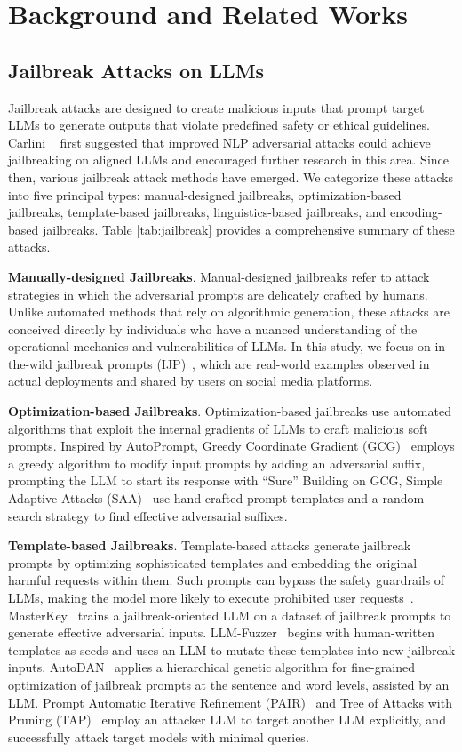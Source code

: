 \section{Background and Related Works}
\subsection{Jailbreak Attacks on LLMs}

Jailbreak attacks are designed to create malicious inputs that prompt target LLMs to generate outputs that violate predefined safety or ethical guidelines. Carlini \etal~\cite{jb1} first suggested that improved NLP adversarial attacks could achieve jailbreaking on aligned LLMs and encouraged further research in this area. Since then, various jailbreak attack methods have emerged. We categorize these attacks into five principal types: manual-designed jailbreaks, optimization-based jailbreaks, template-based jailbreaks, linguistics-based jailbreaks, and encoding-based jailbreaks. Table \ref{tab:jailbreak} provides a comprehensive summary of these attacks.

\noindent\textbf{Manually-designed Jailbreaks}. Manual-designed jailbreaks refer to attack strategies in which the adversarial prompts are delicately crafted by humans. Unlike automated methods that rely on algorithmic generation, these attacks are conceived directly by individuals who have a nuanced understanding of the operational mechanics and vulnerabilities of LLMs.
In this study, we focus on in-the-wild jailbreak prompts (IJP)~\cite{ijp,ijp2}, which are real-world examples observed in actual deployments and shared by users on social media platforms.

\noindent\textbf{Optimization-based Jailbreaks}. 
Optimization-based jailbreaks use automated algorithms that exploit the internal gradients of LLMs to craft malicious soft prompts. Inspired by AutoPrompt, Greedy Coordinate Gradient (GCG)~\cite{gcg} employs a greedy algorithm to modify input prompts by adding an adversarial suffix, prompting the LLM to start its response with ``Sure'' Building on GCG, Simple Adaptive Attacks (SAA)~\cite{saa} use hand-crafted prompt templates and a random search strategy to find effective adversarial suffixes.

\noindent\textbf{Template-based Jailbreaks}. 
Template-based attacks generate jailbreak prompts by optimizing sophisticated templates and embedding the original harmful requests within them. Such prompts can bypass the safety guardrails of LLMs, making the model more likely to execute prohibited user requests~\cite{template-based}.
MasterKey~\cite{MasterKey} trains a jailbreak-oriented LLM on a dataset of jailbreak prompts to generate effective adversarial inputs. LLM-Fuzzer~\cite{llmfuzzer} begins with human-written templates as seeds and uses an LLM to mutate these templates into new jailbreak inputs. AutoDAN~\cite{autodan} applies a hierarchical genetic algorithm for fine-grained optimization of jailbreak prompts at the sentence and word levels, assisted by an LLM. Prompt Automatic Iterative Refinement (PAIR)~\cite{pair} and Tree of Attacks with Pruning (TAP)~\cite{tap} employ an attacker LLM to target another LLM explicitly, and successfully attack target models with minimal queries.

